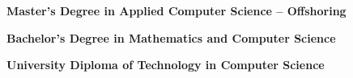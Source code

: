 \begin{scholarship}
    \emptySeparator
					{\textbf{Master's Degree in Applied Computer Science -- Offshoring}}
	\emptySeparator

					{\textbf{Bachelor's Degree in Mathematics and Computer Science}}
	\emptySeparator

					{\textbf{University Diploma of Technology in Computer Science}}
	
    \emptySeparator
\end{scholarship}